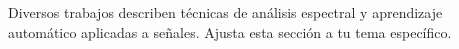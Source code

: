Diversos trabajos describen técnicas de análisis espectral y aprendizaje automático aplicadas a señales. Ajusta esta sección a tu tema específico.
